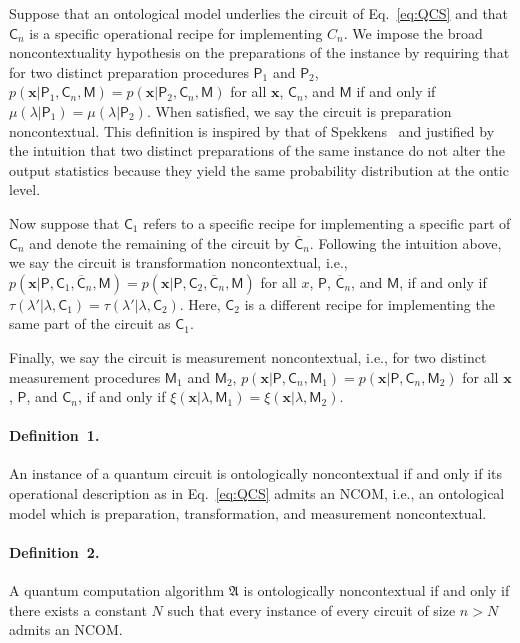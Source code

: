\documentclass[prl,twocolumn,amsmath,amssymb,nofootinbib]{revtex4-1}
\newcommand{\MM}{\mathsf{M}}
\newcommand{\pp}{\mathsf{P}}
\newcommand{\cc}{\mathsf{C}}
\newcommand{\alg}{\mathfrak{A}}
\begin{document}
Suppose that an ontological model underlies the circuit of Eq.~\eqref{eq:QCS} and that $\cc_n$ is a specific operational recipe for implementing $C_n$.
We impose the broad noncontextuality hypothesis on the preparations of the instance by requiring that for two distinct preparation procedures $\pp_1$ and $\pp_2$, $p(\mathbf{x}|\pp_1,\cc_n,\MM) {=} p(\mathbf{x}|\pp_2,\cc_n,\MM)$ for all $\mathbf{x}$, $\cc_n$, and $\MM$ if and only if $\mu(\lambda|\pp_1){=}\mu(\lambda|\pp_2)$.
When satisfied, we say the circuit is preparation noncontextual.
This definition is inspired by that of Spekkens~\cite{Spekkens2005} and justified by the intuition that two distinct preparations of the same instance do not alter the output statistics because they yield the same probability distribution at the ontic level.

Now suppose that $\cc_1$ refers to a specific recipe for implementing a specific part of $\cc_n$ and denote the remaining of the circuit by $\overline{\cc}_n$.
Following the intuition above, we say the circuit is transformation noncontextual, i.e., $p(\mathbf{x}|\pp,\cc_1,\overline{\cc}_n,\MM) {=} p(\mathbf{x}|\pp,\cc_2,\overline{\cc}_n,\MM)$ for all $x$, $\pp$, $\overline{\cc}_n$, and $\MM$, if and only if $\tau(\lambda'|\lambda,\cc_1){=}\tau(\lambda'|\lambda,\cc_2)$.
Here, $\cc_2$ is a different recipe for implementing the same part of the circuit as $\cc_1$.

Finally, we say the circuit is measurement noncontextual, i.e., for two distinct measurement procedures $\MM_1$ and $\MM_2$, $p(\mathbf{x}|\pp,\cc_n,\MM_1) {=} p(\mathbf{x}|\pp,\cc_n,\MM_2)$ for all $\mathbf{x}$, $\pp$, and $\cc_n$, if and only if $\xi(\mathbf{x}|\lambda,\MM_1){=}\xi(\mathbf{x}|\lambda,\MM_2)$.

%
\paragraph*{\textbf{Definition~1.}}
An instance of a quantum circuit is ontologically noncontextual if and only if its operational description as in Eq.~\eqref{eq:QCS} admits an NCOM, i.e., an ontological model which is preparation, transformation, and measurement noncontextual.

%
\paragraph*{\textbf{Definition~2.}}
A quantum computation algorithm $\alg$ is ontologically noncontextual if and only if there exists a constant $N$ such that every instance of every circuit of size $n {>} N$ admits an NCOM.
%
\end{document}
